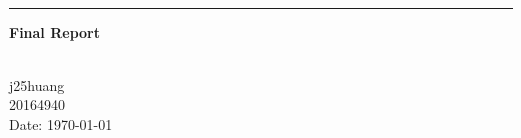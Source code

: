 \begin{titlepage}
\begin{center}


      \huge \textbf{\thetitle}
\\[0.30em]	  {\hrule height0.02em}

\vspace{0.5em}
	\Large \textbf{Final Report}

    \vfill
    \small
	\textbf{\theauthor}
\\[1.2em]
    
	j25huang
	\\20164940
\\[3em]
	
      Date: \today


\end{center}
\end{titlepage}
\clearpage
